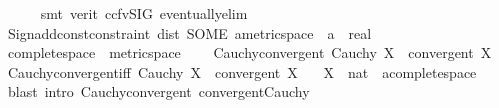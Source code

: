 \begin{isabellebody}
\ \ \ \ \isamarkupfalse%
\ {\isacharparenleft}{\kern0pt}smt\ {\isacharparenleft}{\kern0pt}verit{\isacharcomma}{\kern0pt}\ ccfv{\isacharunderscore}{\kern0pt}SIG{\isacharparenright}{\kern0pt}\ eventually{\isacharunderscore}{\kern0pt}elim{}{\isacharparenright}{\kern0pt}\isanewline
{}\isamarkupfalse%
%
\endisatagproof
{\isafoldproof}%
%
\isadelimproof
\isanewline
%
\endisadelimproof
%
\isadelimML
\isanewline
%
\endisadelimML
%
\isatagML
{}\isamarkupfalse%
\ {\isacartoucheopen}Sign{\isachardot}{\kern0pt}add{\isacharunderscore}{\kern0pt}const{\isacharunderscore}{\kern0pt}constraint\ {\isacharparenleft}{\kern0pt}\isactrlconstUNDERSCOREname {\isasymopen}dist{\isasymclose}{\isacharcomma}{\kern0pt}\ SOME\ \isactrltyp {\isasymopen}{\isacharprime}{\kern0pt}a{\isacharcolon}{\kern0pt}{\isacharcolon}{\kern0pt}metric{\isacharunderscore}{\kern0pt}space\ {\isasymRightarrow}\ {\isacharprime}{\kern0pt}a\ {\isasymRightarrow}\ real{\isasymclose}{\isacharparenright}{\kern0pt}{\isacartoucheclose}%
\endisatagML
{\isafoldML}%
%
\isadelimML
%
\endisadelimML
%
\isadelimdocument
%
\endisadelimdocument
%
\isatagdocument
%
\isamarkuptrue%
%
\endisatagdocument
{\isafolddocument}%
%
\isadelimdocument
%
\endisadelimdocument
{}\isamarkupfalse%
\ complete{\isacharunderscore}{\kern0pt}space\ {\isacharequal}{\kern0pt}\ metric{\isacharunderscore}{\kern0pt}space\ {\isacharplus}{\kern0pt}\isanewline
\ \ \ Cauchy{\isacharunderscore}{\kern0pt}convergent{\isacharcolon}{\kern0pt}\ {\isachardoublequoteopen}Cauchy\ X\ {\isasymLongrightarrow}\ convergent\ X{\isachardoublequoteclose}\isanewline
\isanewline
{}\isamarkupfalse%
\ Cauchy{\isacharunderscore}{\kern0pt}convergent{\isacharunderscore}{\kern0pt}iff{\isacharcolon}{\kern0pt}\ {\isachardoublequoteopen}Cauchy\ X\ {\isasymlongleftrightarrow}\ convergent\ X{\isachardoublequoteclose}\isanewline
\ \ \ X\ {\isacharcolon}{\kern0pt}{\isacharcolon}{\kern0pt}\ {\isachardoublequoteopen}nat\ {\isasymRightarrow}\ {\isacharprime}{\kern0pt}a{\isacharcolon}{\kern0pt}{\isacharcolon}{\kern0pt}complete{\isacharunderscore}{\kern0pt}space{\isachardoublequoteclose}\isanewline
%
\isadelimproof
\ \ %
\endisadelimproof
%
\isatagproof
{}\isamarkupfalse%
\ {\isacharparenleft}{\kern0pt}blast\ intro{\isacharcolon}{\kern0pt}\ Cauchy{\isacharunderscore}{\kern0pt}convergent\ convergent{\isacharunderscore}{\kern0pt}Cauchy{\isacharparenright}{\kern0pt}%
\endisatagproof
{\isafoldproof}%
%

\end{isabellebody}
